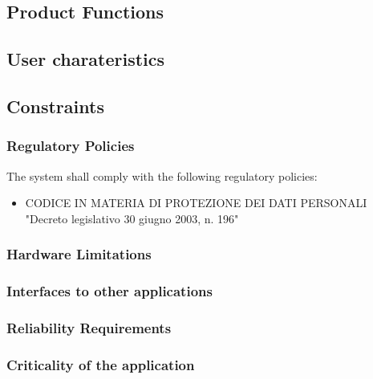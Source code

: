 \documentclass[11pt, a4paper,titlepage]{article}
\begin{document}
\subsection{Product Functions}
\subsection{User charateristics}
\subsection{Constraints}
\subsubsection{Regulatory Policies}
The system shall comply with the following regulatory policies:
\begin{itemize}
	\item CODICE IN MATERIA DI PROTEZIONE DEI DATI PERSONALI "Decreto legislativo 30 giugno 2003, n. 196"
\end{itemize}
\subsubsection{Hardware Limitations}
\subsubsection{Interfaces to other applications}
\subsubsection{Reliability Requirements}
\subsubsection{Criticality of the application}
\end{document}
